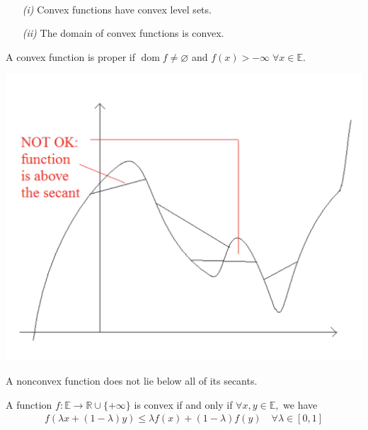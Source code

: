\documentclass{tufte-handout}
\DeclareMathOperator{\dom}{dom}
\begin{document}
{\begin{remark} $  $
 \begin{enumerate}
   \item[\it (i)] Convex functions have convex level sets.
   \item[\it (ii)] The domain of convex functions is convex.
 \end{enumerate} 
 \end{remark}
\begin{definition}
  A convex function is proper if $\dom f \neq \varnothing$ and $f(x)> -\infty \; \forall x \in \mathbb{E}$.
  \begin{marginfigure}
  \includegraphics{nonConvex}
  \label{ConvexExamples2015}
  \caption{A nonconvex function does not lie below all of its secants.}
\end{marginfigure}

\end{definition}
 \begin{proposition} \label{CharConvex}
   A function $f : \mathbb{E} \to \mathbb{R} \cup \{+\infty\}$ is convex if and only if $\forall x, y\in \mathbb{E} ,$ we have \cite{ConvexExamples2015} 
   \begin{equation} \label{charconv_eq}
    \begin{split}
    f(\lambda x + (1 - \lambda)y) \leq \lambda f(x)  + (1- \lambda) f(y) \quad \forall \lambda \in [0,1] 
    \end{split}
   \end{equation}


\end{proposition}}
\end{document}
